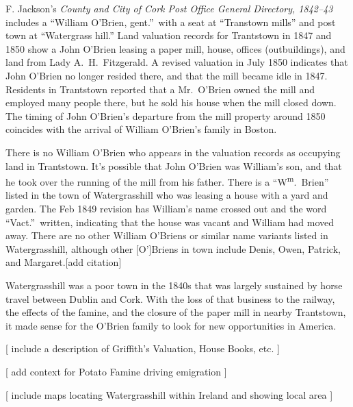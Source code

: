 F. Jackson's \textit{County and City of Cork Post Office General Directory, 1842--43} includes a ``William O'Brien, gent.''\ with a seat at ``Transtown mills'' and post town at ``Watergrass hill.''\cite{Jacksons} Land valuation records for Trantstown in 1847 and 1850 show a John O'Brien leasing a paper mill, house, offices (outbuildings), and land from Lady A.\ H.\ Fitzgerald.\cite{Peramb1847,Peramb1850} A revised valuation in July 1850 indicates that John O'Brien no longer resided there, and that the mill became idle in 1847.\cite{House1850} Residents in Trantstown reported that a Mr.\ O'Brien owned the mill and employed many people there, but he sold his house when the mill closed down.\cite{PaperMill} The timing of John O'Brien's departure from the mill property around 1850 coincides with the arrival of William O'Brien's family in Boston.

There is no William O'Brien who appears in the valuation records as occupying land in Trantstown. It's possible that John O'Brien was William's son, and that he took over the running of the mill from his father. There is a ``W\textsuperscript{m}.\ Brien'' listed in the town of Watergrasshill who was leasing a house with a yard and garden. The Feb 1849 revision has William's name crossed out and the word ``Vact.''\ written, indicating that the house was vacant and William had moved away.\cite{House1849} There are no other William O'Briens or similar name variants listed in Watergrasshill, although other [O']Briens in town include Denis, Owen, Patrick, and Margaret.[add citation]

Watergrasshill was a poor town in the 1840s that was largely sustained by horse travel between Dublin and Cork. With the loss of that business to the railway, the effects of the famine, and the closure of the paper mill in nearby Trantstown, it made sense for the O'Brien family to look for new opportunities in America.



[ include a description of Griffith's Valuation, House Books, etc. ]

[ add context for Potato Famine driving emigration ]

[ include maps locating Watergrasshill within Ireland and showing local area ]
